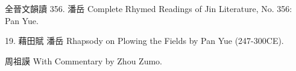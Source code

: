 \begin{longtable}{p{} p{}}
















\end{longtable}

全晉文韻讀 356. 潘岳
Complete Rhymed Readings of Jin Literature, No. 356: Pan Yue.

19. 藉田賦 潘岳
Rhapsody on Plowing the Fields by Pan Yue (247-300CE).

周祖謨
With Commentary by Zhou Zumo.

